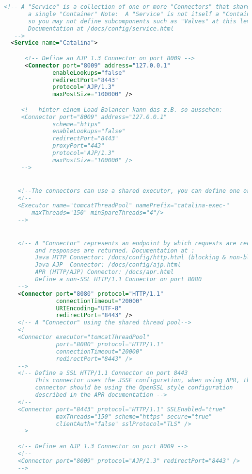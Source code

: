 \begin{lstlisting}[language=xml]
  <!-- A "Service" is a collection of one or more "Connectors" that share
       a single "Container" Note:  A "Service" is not itself a "Container",
       so you may not define subcomponents such as "Valves" at this level.
       Documentation at /docs/config/service.html
   -->
  <Service name="Catalina">

      <!-- Define an AJP 1.3 Connector on port 8009 -->
      <Connector port="8009" address="127.0.0.1"
              enableLookups="false" 
              redirectPort="8443"
              protocol="AJP/1.3"
              maxPostSize="100000" />

     <!-- hinter einem Load-Balancer kann das z.B. so aussehen:
     <Connector port="8009" address="127.0.0.1" 
              scheme="https"
              enableLookups="false"
              redirectPort="8443" 
              proxyPort="443" 
              protocol="AJP/1.3"
              maxPostSize="100000" />
     -->


    <!--The connectors can use a shared executor, you can define one or more named thread pools-->
    <!--
    <Executor name="tomcatThreadPool" namePrefix="catalina-exec-"
        maxThreads="150" minSpareThreads="4"/>
    -->


    <!-- A "Connector" represents an endpoint by which requests are received
         and responses are returned. Documentation at :
         Java HTTP Connector: /docs/config/http.html (blocking & non-blocking)
         Java AJP  Connector: /docs/config/ajp.html
         APR (HTTP/AJP) Connector: /docs/apr.html
         Define a non-SSL HTTP/1.1 Connector on port 8080
    -->
    <Connector port="8080" protocol="HTTP/1.1"
               connectionTimeout="20000"
               URIEncoding="UTF-8"
               redirectPort="8443" />
    <!-- A "Connector" using the shared thread pool-->
    <!--
    <Connector executor="tomcatThreadPool"
               port="8080" protocol="HTTP/1.1"
               connectionTimeout="20000"
               redirectPort="8443" />
    -->
    <!-- Define a SSL HTTP/1.1 Connector on port 8443
         This connector uses the JSSE configuration, when using APR, the
         connector should be using the OpenSSL style configuration
         described in the APR documentation -->
    <!--
    <Connector port="8443" protocol="HTTP/1.1" SSLEnabled="true"
               maxThreads="150" scheme="https" secure="true"
               clientAuth="false" sslProtocol="TLS" />
    -->

    <!-- Define an AJP 1.3 Connector on port 8009 -->
    <!--
    <Connector port="8009" protocol="AJP/1.3" redirectPort="8443" />
    -->



\end{lstlisting}
